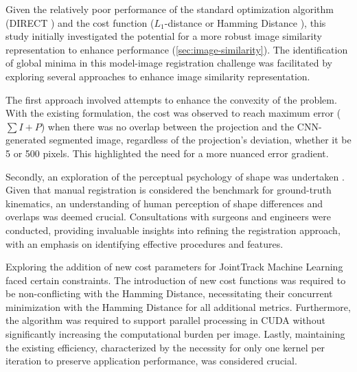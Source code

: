 Given the relatively poor performance of the standard optimization algorithm (DIRECT \cite{jonesLipschitzianOptimizationLipschitz1993,floodAutomatedRegistration3D2018}) and the cost function ($L_{1}$-distance or Hamming Distance \cite{floodAutomatedRegistration3D2018}), this study initially investigated the potential for a more robust image similarity representation to enhance performance (\cref{sec:image-similarity}).
The identification of global minima in this model-image registration challenge was facilitated by exploring several approaches to enhance image similarity representation.

The first approach involved attempts to enhance the convexity of the problem.
With the existing formulation, the cost was observed to reach maximum error ($\sum I + P$) when there was no overlap between the projection and the CNN-generated segmented image, regardless of the projection's deviation, whether it be 5 or 500 pixels.
This highlighted the need for a more nuanced error gradient.

Secondly, an exploration of the perceptual psychology of shape was undertaken \cite{attneaveInformationalAspectsVisual1954,attneaveQuantitativeStudyShape1956}.
Given that manual registration is considered the benchmark for ground-truth kinematics, an understanding of human perception of shape differences and overlaps was deemed crucial.
Consultations with surgeons and engineers were conducted, providing invaluable insights into refining the registration approach, with an emphasis on identifying effective procedures and features.

Exploring the addition of new cost parameters for JointTrack Machine Learning faced certain constraints.
The introduction of new cost functions was required to be non-conflicting with the Hamming Distance, necessitating their concurrent minimization with the Hamming Distance for all additional metrics.
Furthermore, the algorithm was required to support parallel processing in CUDA without significantly increasing the computational burden per image.
Lastly, maintaining the existing efficiency, characterized by the necessity for only one kernel per iteration to preserve application performance, was considered crucial.




